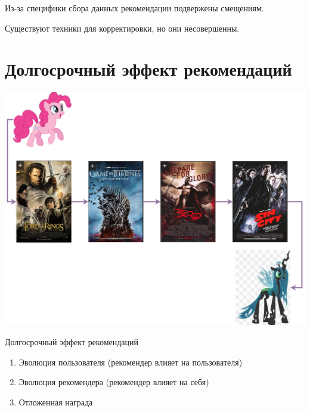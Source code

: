 \documentclass[11pt,aspectratio=169,handout]{beamer}
\begin{document}
\begin{frame}

\begin{tcolorbox}[colback=info!5,colframe=info!80,title=]
Из-за специфики сбора данных рекомендации подвержены смещениям. 
\end{tcolorbox}
\begin{tcolorbox}[colback=info!5,colframe=info!80,title=]
Существуют техники для корректировки, но они несовершенны.
\end{tcolorbox}

\end{frame}

\section{Долгосрочный эффект рекомендаций}

\begin{frame}{}

\begin{center}
\includegraphics[scale=0.22]{images/longterm.png}
\end{center}

\end{frame}

\begin{frame}{Долгосрочный эффект рекомендаций}

\begin{tcolorbox}[colback=info!5,colframe=info!80,title=]
\begin{enumerate}[<+->]
\item Эволюция пользователя (рекомендер влияет на пользователя)
\item Эволюция рекомендера (рекомендер влияет на себя)
\item Отложенная награда
\end{enumerate}
\end{tcolorbox}

\end{frame}
\end{document}
